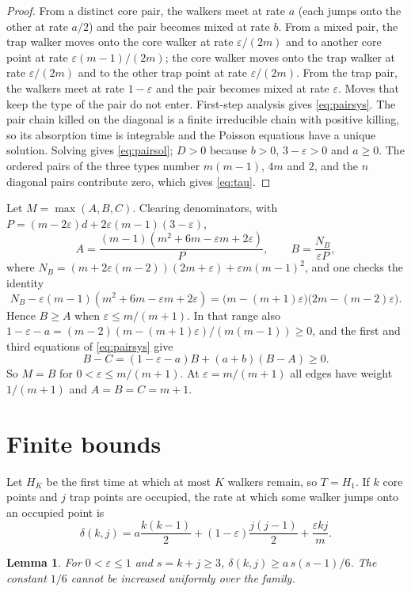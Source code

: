 \documentclass[11pt,a4paper]{article}
\numberwithin{equation}{section}
\newtheorem{lemma}[theorem]{Lemma}
\theoremstyle{remark}
\newcommand{\eps}{\varepsilon}
\begin{document}
\begin{proof}
From a distinct core pair, the walkers meet at rate $a$ (each jumps onto the other at rate $a/2$) and the pair becomes mixed at rate $b$. From a mixed pair, the trap walker moves onto the core walker at rate $\eps/(2m)$ and to another core point at rate $\eps(m-1)/(2m)$; the core walker moves onto the trap walker at rate $\eps/(2m)$ and to the other trap point at rate $\eps/(2m)$. From the trap pair, the walkers meet at rate $1-\eps$ and the pair becomes mixed at rate $\eps$. Moves that keep the type of the pair do not enter. First-step analysis gives \eqref{eq:pairsys}. The pair chain killed on the diagonal is a finite irreducible chain with positive killing, so its absorption time is integrable and the Poisson equations have a unique solution. Solving gives \eqref{eq:pairsol}; $D>0$ because $b>0$, $3-\eps>0$ and $a\ge0$. The ordered pairs of the three types number $m(m-1)$, $4m$ and $2$, and the $n$ diagonal pairs contribute zero, which gives \eqref{eq:tau}.
\end{proof}

Let $M=\max(A,B,C)$. Clearing denominators, with $P=(m-2\eps)d+2\eps(m-1)(3-\eps)$,
\[
A=\frac{(m-1)(m^2+6m-\eps m+2\eps)}{P},\qquad B=\frac{N_B}{\eps P},
\]
where $N_B=(m+2\eps(m-2))(2m+\eps)+\eps m(m-1)^2$,
and one checks the identity
\begin{equation}\label{eq:BA}
N_B-\eps(m-1)(m^2+6m-\eps m+2\eps)=\bigl(m-(m+1)\eps\bigr)\bigl(2m-(m-2)\eps\bigr).
\end{equation}
Hence $B\ge A$ when $\eps\le m/(m+1)$. In that range also $1-\eps-a=(m-2)(m-(m+1)\eps)/(m(m-1))\ge0$, and the first and third equations of \eqref{eq:pairsys} give
\[
B-C=(1-\eps-a)B+(a+b)(B-A)\ge0 .
\]
So $M=B$ for $0<\eps\le m/(m+1)$. At $\eps=m/(m+1)$ all edges have weight $1/(m+1)$ and $A=B=C=m+1$.

\section{Finite bounds}\label{sec:finite}

Let $H_K$ be the first time at which at most $K$ walkers remain, so $T=H_1$. If $k$ core points and $j$ trap points are occupied, the rate at which some walker jumps onto an occupied point is
\begin{equation}\label{eq:death}
\delta(k,j)=a\frac{k(k-1)}2+(1-\eps)\frac{j(j-1)}2+\frac{\eps kj}m .
\end{equation}

\begin{lemma}\label{lem:death}
For $0<\eps\le1$ and $s=k+j\ge3$, $\delta(k,j)\ge a\,s(s-1)/6$. The constant $1/6$ cannot be increased uniformly over the family.
\end{lemma}
\end{document}
